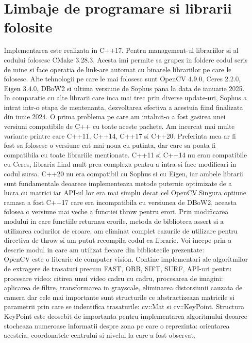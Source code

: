\documentclass[12pt,a4paper]{report}
\begin{document}
\section{Limbaje de programare si librarii folosite}
Implementarea este realizata in C++17. Pentru management-ul librariilor si al codului folosesc
CMake 3.28.3. Acesta imi permite sa grupez in foldere codul scris de mine si face operatia de 
link-are automat cu binarele librariilor pe care le folosesc. Alte tehnologii pe care le 
mai folosesc sunt OpenCV 4.9.0, Ceres 2.2.0, Eigen 3.4.0, DBoW2 si ultima versiune de Sophus
pana la data de ianuarie 2025. In comparatie cu alte librarii care inca mai trec 
prin diverse update-uri, Sophus a intrat intr-o etapa de mentenanta, dezvoltarea efectiva a 
acestuia fiind finalizata din iunie 2024. O prima problema pe care am intalnit-o a fost gasirea 
unei versiuni compatibile de C++ cu toate aceste pachete. Am incercat mai multe variante printre 
care C++11, C++14, C++17 si C++20. Preferinta mea ar fi fost sa folosesc o versiune cat mai noua
cu putinta, dar care sa poata fi compatibila cu toate librariile mentionate. C++11 si C++14 nu 
erau compatibile cu Ceres, libraria fiind mult prea complexa pentru a intra si face modificari in
codul sursa. C++20 nu era compatibil cu Sophus si cu Eigen, iar ambele librarii sunt fundamentale 
deoarece implementeaza metode puternic optimizate de a lucra cu matrici iar API-ul lor era mai 
simplu decat cel OpenCV.\@ Singura optiune ramasa a fost C++17 care era incompatibila cu versiunea 
de DBoW2, aceasta folosea o versiune mai veche a functiei throw pentru erori. Prin modificarea
modului in care functiile returnau erorile, metoda de biblioteca assert si a 
utilizarea codurilor de eroare, am eliminat complet cazurile de utilizare pentru directiva de throw
si am putut recompila codul ca librarie. Voi incepe prin a descrie modul in care am utilizat 
fiecare din bibliotecile prezentate: \\
OpenCV este o librarie de computer vision. Contine implementari ale algoritmilor de extragere de
trasaturi precum FAST, ORB, SIFT, SURF, API-uri pentru procesare video: citirea unui video cadru
cu cadru, procesarea de imagini: aplicarea de filtre, transformarea in grayscale, eliminarea distorsiunii
cauzata de camera dar cele mai importante sunt structurile ce abstractizeaza matricile si parametrii 
prin care se indentifica trasaturile: cv::Mat si cv::KeyPoint. Structura KeyPoint este deosebit de
importanta pentru implementarea algoritmului deoarce stocheaza numeroase informatii despre zona
pe care o reprezinta: orientarea acesteia, coordonatele centrului si nivelul la care a fost observat, 
\end{document}
